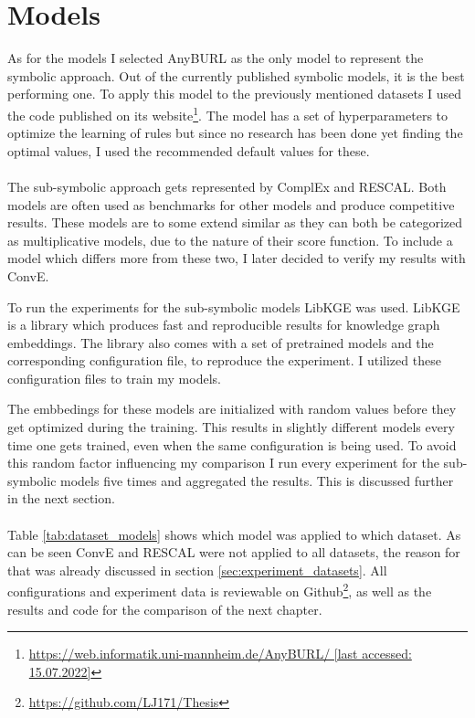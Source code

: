 \section{Models}
As for the models I selected AnyBURL as the only model to represent the symbolic approach. Out of the currently published symbolic models, it is the best performing one. To apply this model to the previously mentioned datasets I used the code published on its website\footnote{\href{https://web.informatik.uni-mannheim.de/AnyBURL/}{https://web.informatik.uni-mannheim.de/AnyBURL/ [last accessed: 15.07.2022]}}. The model has a set of hyperparameters to optimize the learning of rules but since no research has been done yet finding the optimal values, I used the recommended default values for these. 
\\ \\
The sub-symbolic approach gets represented by ComplEx and RESCAL. Both models are often used as benchmarks for other models and produce competitive results. These models are to some extend similar as they can both be categorized as multiplicative models, due to the nature of their score function. To include a model which differs more from these two, I later decided to verify my results with ConvE.
 
To run the experiments for the sub-symbolic models LibKGE was used. LibKGE is a library which produces fast and reproducible results for knowledge graph embeddings. \cite{broscheit_libkge_2020} The library also comes with a set of pretrained models and the corresponding configuration file, to reproduce the experiment. I utilized these configuration files to train my models. 

The embbedings for these models are  initialized with random values before they get optimized during the training. This results in slightly different models every time one gets trained, even when the same configuration is being used. To avoid this random factor influencing my comparison I run every experiment for the sub-symbolic models five times and aggregated the results. This is discussed further in the next section.
\\ \\
Table \ref{tab:dataset_models} shows which model was applied to which dataset. As can be seen ConvE and RESCAL were not applied to all datasets, the reason for that was already discussed in section \ref{sec:experiment_datasets}. All configurations and experiment data is reviewable on Github\footnote{\href{https://github.com/LJ171/Thesis}{https://github.com/LJ171/Thesis}}, as well as the results and code for the comparison of the next chapter.


